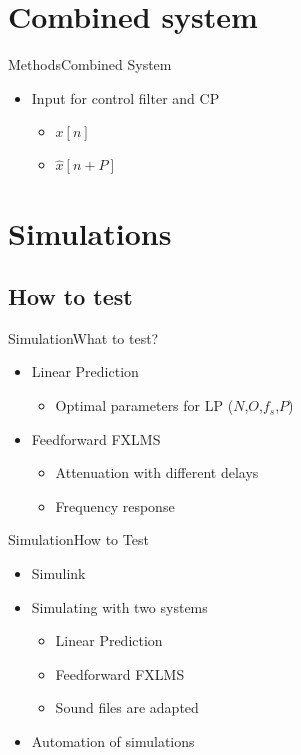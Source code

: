 \section{Combined system}
\begin{frame}{Methods}{Combined System}	
		\begin{itemize}
			\item Input for control filter and CP
			\begin{itemize}
			\item $x[n]$
			\item $\hat{x}[n+P]$
			\end{itemize}
		\end{itemize}
\begin{center}
	\resizebox{0.9\columnwidth}{!}{		
			}
\end{center}
\end{frame}



\section{Simulations}
\subsection{How to test}

\begin{frame}{Simulation}{What to test?}	
\begin{itemize}
	\item Linear Prediction
	\begin{itemize}
		\item Optimal parameters for LP ($N$,$O$,$f_s$,$P$)
	\end{itemize}
	\item Feedforward FXLMS	
	\begin{itemize}
		\item Attenuation with different delays
		\item Frequency response
	\end{itemize}
\end{itemize}
\end{frame}

\begin{frame}{Simulation}{How to Test}	
\begin{itemize}
	\item Simulink
	\item Simulating with two systems 
	\begin{itemize}
		\item Linear Prediction
		\item Feedforward FXLMS
		\item Sound files are adapted 
	\end{itemize}
	\item Automation of simulations	
\end{itemize}
\end{frame}


